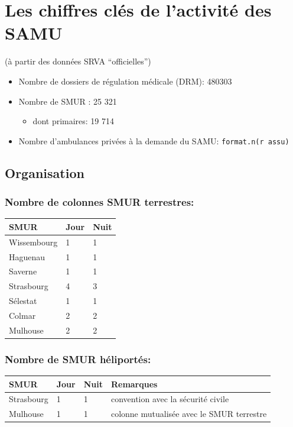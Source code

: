 \documentclass[]{article}
\begin{document}
\section{Les chiffres clés de l'activité des
SAMU}\label{les-chiffres-cles-de-lactivite-des-samu}

(à partir des données SRVA ``officielles'')

\begin{itemize}
\itemsep1pt\parskip0pt
\item
  Nombre de dossiers de régulation médicale (DRM): 480303
\item
  Nombre de SMUR : 25 321

  \begin{itemize}
  \itemsep1pt\parskip0pt
  \item
    dont primaires: 19 714
  \end{itemize}
\item
  Nombre d'ambulances privées à la demande du SAMU:
  \texttt{format.n(r assu)}
\end{itemize}

\subsection{Organisation}\label{organisation}

\subsubsection{Nombre de colonnes SMUR
terrestres:}\label{nombre-de-colonnes-smur-terrestres}

\begin{longtable}[c]{@{}lll@{}}
\toprule
SMUR & Jour & Nuit\tabularnewline
\midrule
\endhead
Wissembourg & 1 & 1\tabularnewline
Haguenau & 1 & 1\tabularnewline
Saverne & 1 & 1\tabularnewline
Strasbourg & 4 & 3\tabularnewline
Sélestat & 1 & 1\tabularnewline
Colmar & 2 & 2\tabularnewline
Mulhouse & 2 & 2\tabularnewline
\bottomrule
\end{longtable}

\subsubsection{Nombre de SMUR
héliportés:}\label{nombre-de-smur-heliportes}

\begin{longtable}[c]{@{}llll@{}}
\toprule
SMUR & Jour & Nuit & Remarques\tabularnewline
\midrule
\endhead
Strasbourg & 1 & 1 & convention avec la sécurité civile\tabularnewline
Mulhouse & 1 & 1 & colonne mutualisée avec le SMUR
terrestre\tabularnewline
\bottomrule
\end{longtable}
\end{document}
